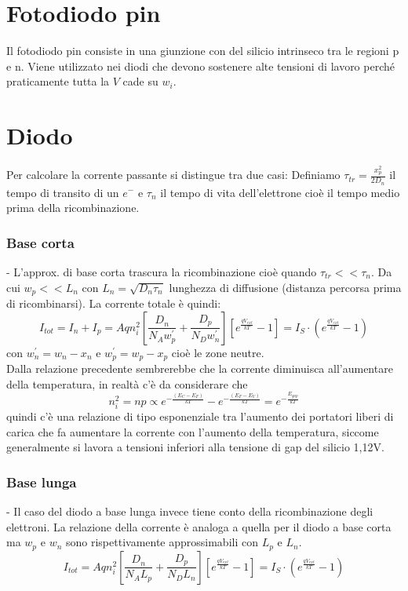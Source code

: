\documentclass{article}
\begin{document}
\section*{Fotodiodo pin}
Il fotodiodo pin consiste in una giunzione con del silicio intrinseco tra le regioni p e n. Viene utilizzato nei diodi che devono sostenere alte tensioni di lavoro perché praticamente tutta la $V$ cade su $w_i$.

\section*{Diodo}
Per calcolare la corrente passante si distingue tra due casi:
Definiamo $\tau_{tr} = \frac{x_p^2}{2D_n}$ il tempo di transito di un $e^{-}$ e $\tau_n$ il tempo di vita dell'elettrone cioè il tempo medio prima della  ricombinazione.

\subsubsection*{Base corta}
- L'approx. di base corta trascura la ricombinazione cioè quando $\tau_{tr}<<\tau_n$. Da cui $w_p<<L_n$ con $L_n = \sqrt{D_n \tau_n}$ lunghezza di diffusione (distanza percorsa prima di ricombinarsi).
La corrente totale è quindi:
\begin{equation*}
I_{tot} = I_n + I_p = Aqn_i^2 \left[ \frac{D_n}{N_A w_p^\prime} + \frac{D_p}{N_D w_n^\prime} \right] \left[ e^\frac{qV_{ext}}{kT} - 1 \right] = I_S \cdot \left( e^\frac{qV_{ext}}{kT} - 1 \right)
\end{equation*}
con $w_n^\prime = w_n - x_n$ e $w_p^\prime = w_p - x_p$ cioè le zone neutre.\\
Dalla relazione precedente sembrerebbe che la corrente diminuisca all'aumentare della temperatura, in realtà c'è da considerare che 
\begin{equation*}
n_i^2 = np \propto e^{-\frac{(E_C - E_F)}{kT}} - e^{-\frac{(E_F - E_V)}{kT}} = e^{-\frac{E_{gap}}{kT}}
\end{equation*}
quindi c'è una relazione di tipo esponenziale tra l'aumento dei portatori liberi di carica che fa aumentare la corrente con l'aumento della temperatura, siccome generalmente si lavora a tensioni inferiori alla tensione di gap del silicio 1,12V.

\subsubsection*{Base lunga}
- Il caso del diodo a base lunga invece tiene conto della ricombinazione degli elettroni. La relazione della corrente è analoga a quella per il diodo a base corta ma $w_p$ e $w_n$ sono rispettivamente approssimabili con $L_p$ e $L_n$. 
\begin{equation*}
I_{tot} = Aqn_i^2 \left[ \frac{D_n}{N_A L_p} + \frac{D_p}{N_D L_n} \right] \left[ e^\frac{qV_{ext}}{kT} - 1 \right] = I_S \cdot \left( e^\frac{qV_{ext}}{kT} - 1 \right)
\end{equation*}
\end{document}

